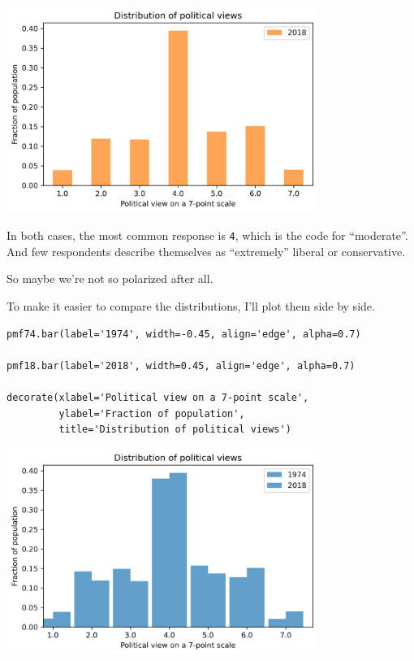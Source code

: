 \begin{center}
\includegraphics[width=4in]{chapters/02_polviews_files/02_polviews_32_0.png}
\end{center}

In both cases, the most common response is \passthrough{\lstinline!4!},
which is the code for ``moderate''. And few respondents describe
themselves as ``extremely'' liberal or conservative.

So maybe we're not so polarized after all.

To make it easier to compare the distributions, I'll plot them side by
side.

\begin{lstlisting}[]
pmf74.bar(label='1974', width=-0.45, align='edge', alpha=0.7)

pmf18.bar(label='2018', width=0.45, align='edge', alpha=0.7)

decorate(xlabel='Political view on a 7-point scale',
         ylabel='Fraction of population',
         title='Distribution of political views')
\end{lstlisting}

\begin{center}
\includegraphics[width=4in]{chapters/02_polviews_files/02_polviews_34_0.png}
\end{center}

